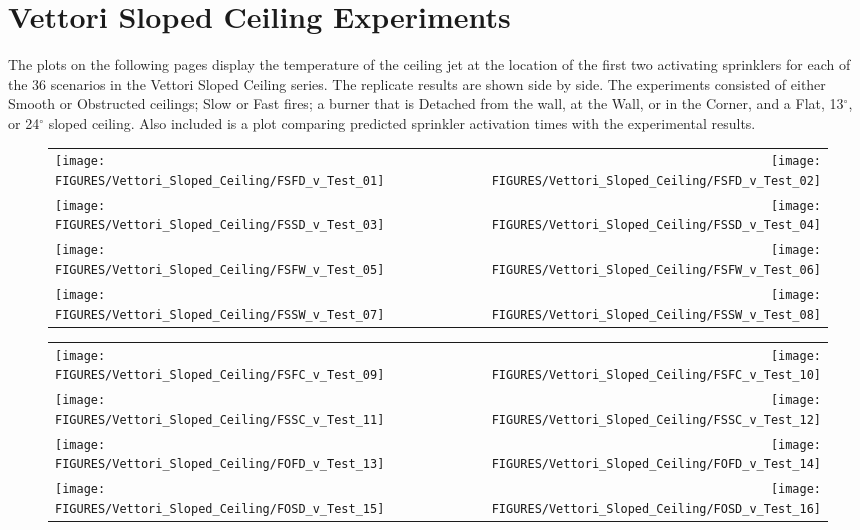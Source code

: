\clearpage

\section{Vettori Sloped Ceiling Experiments}
\label{Vettori_Sloped_Results}


The plots on the following pages display the temperature of the ceiling jet at the location of the first two activating sprinklers for each of the 36 scenarios in the
Vettori Sloped Ceiling series. The replicate results are shown side by side. The
experiments consisted of either Smooth or Obstructed ceilings; Slow or Fast fires; a burner that is Detached from the wall, at the Wall, or in the Corner, and
a Flat, 13$^\circ$, or 24$^\circ$ sloped ceiling.
Also included is a plot comparing predicted sprinkler activation times with the experimental results.

\begin{figure}[p]
\begin{tabular*}{\textwidth}{l@{\extracolsep{\fill}}r}
\texttt{[image: FIGURES/Vettori\_Sloped\_Ceiling/FSFD\_v\_Test\_01]} &
\texttt{[image: FIGURES/Vettori\_Sloped\_Ceiling/FSFD\_v\_Test\_02]} \\
\texttt{[image: FIGURES/Vettori\_Sloped\_Ceiling/FSSD\_v\_Test\_03]} &
\texttt{[image: FIGURES/Vettori\_Sloped\_Ceiling/FSSD\_v\_Test\_04]} \\
\texttt{[image: FIGURES/Vettori\_Sloped\_Ceiling/FSFW\_v\_Test\_05]} &
\texttt{[image: FIGURES/Vettori\_Sloped\_Ceiling/FSFW\_v\_Test\_06]} \\
\texttt{[image: FIGURES/Vettori\_Sloped\_Ceiling/FSSW\_v\_Test\_07]} &
\texttt{[image: FIGURES/Vettori\_Sloped\_Ceiling/FSSW\_v\_Test\_08]} \\
\end{tabular*}
\label{Vettori_Sloped_1}
\end{figure}


\begin{figure}[p]
\begin{tabular*}{\textwidth}{l@{\extracolsep{\fill}}r}
\texttt{[image: FIGURES/Vettori\_Sloped\_Ceiling/FSFC\_v\_Test\_09]} &
\texttt{[image: FIGURES/Vettori\_Sloped\_Ceiling/FSFC\_v\_Test\_10]} \\
\texttt{[image: FIGURES/Vettori\_Sloped\_Ceiling/FSSC\_v\_Test\_11]} &
\texttt{[image: FIGURES/Vettori\_Sloped\_Ceiling/FSSC\_v\_Test\_12]} \\
\texttt{[image: FIGURES/Vettori\_Sloped\_Ceiling/FOFD\_v\_Test\_13]} &
\texttt{[image: FIGURES/Vettori\_Sloped\_Ceiling/FOFD\_v\_Test\_14]} \\
\texttt{[image: FIGURES/Vettori\_Sloped\_Ceiling/FOSD\_v\_Test\_15]} &
\texttt{[image: FIGURES/Vettori\_Sloped\_Ceiling/FOSD\_v\_Test\_16]} \\
\end{tabular*}
\label{Vettori_Sloped_2}
\end{figure}

